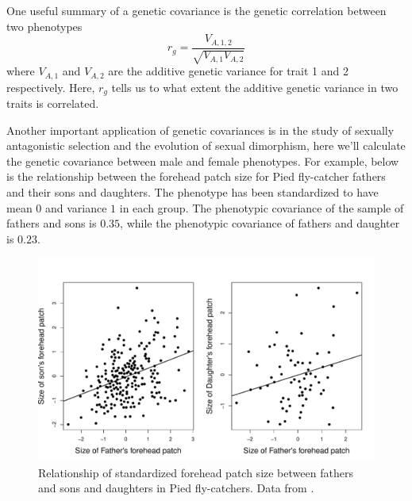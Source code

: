 One useful summary of a genetic covariance is the genetic correlation between two phenotypes
\begin{equation}
r_g = \frac{V_{A,1,2}}{\sqrt{V_{A,1}V_{A,2}}}
\end{equation}
where $V_{A,1}$ and $V_{A,2}$ are the additive genetic variance for trait 1 and 2 respectively. Here, $r_g$ tells us to what extent the additive genetic variance in two traits is correlated.   



Another important application of genetic covariances is in the
study of sexually antagonistic selection and the evolution of sexual
dimorphism, here we'll calculate the genetic covariance between male and female phenotypes. For example, below is the relationship between the forehead patch size for Pied fly-catcher fathers and their sons and daughters. The phenotype has been standardized to have mean $0$  and variance $1$ in each group. The phenotypic covariance of the sample of fathers and sons is $0.35$, while the phenotypic covariance of fathers and daughter is $0.23$. 



\begin{figure}
\begin{center}
\includegraphics[width= \textwidth]{Journal_figs/Quant_gen/pied_fly_catcher_sex_genetic_corr/FlyCatcher_genetic_corr.pdf}
\end{center}
\caption{Relationship of standardized forehead patch size between
  fathers and sons and daughters in  Pied fly-catchers. Data from
  \citeauthor{potti:11}. } \label{fig:FlyCatcher_genetic_corr}   %
\end{figure}

